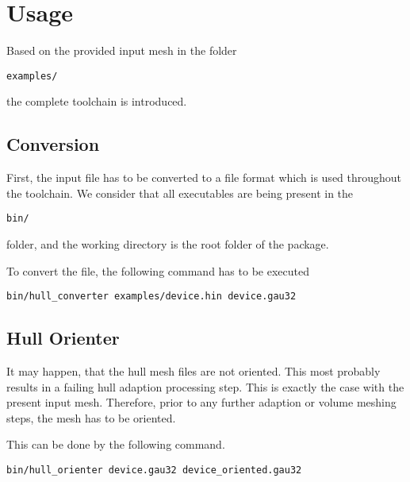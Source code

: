 \section{Usage}
Based on the provided input mesh in the folder 

\begin{exaipd}
\begin{Verbatim}
examples/
\end{Verbatim}
\end{exaipd}

the complete toolchain is introduced.

\subsection{Conversion}
First, the input file has to be converted to a file format 
which is used throughout the toolchain.
We consider that all executables are being present in the 
\begin{exaipd}
\begin{Verbatim}
bin/
\end{Verbatim}
\end{exaipd}
folder, and the working directory is the root folder of the package.

To convert the file, the following command has to be executed
\begin{exaipd}
\begin{Verbatim}
bin/hull_converter examples/device.hin device.gau32
\end{Verbatim}
\end{exaipd}

\subsection{Hull Orienter}
It may happen, that the hull mesh files are not oriented. This most 
probably results in a failing hull adaption processing step. 
This is exactly the case with the present input mesh. 
Therefore, prior to any further adaption or volume meshing steps, the mesh 
has to be oriented. 


This can be done by the following command.

\begin{exaipd}
\begin{Verbatim}
bin/hull_orienter device.gau32 device_oriented.gau32
\end{Verbatim}
\end{exaipd}

